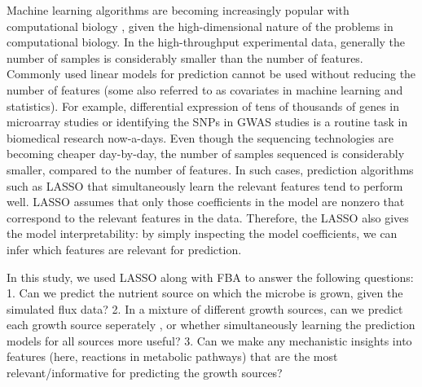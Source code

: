 \documentclass[12pt]{article}
\begin{document}
\bigskip
\noindent
Machine learning algorithms are becoming increasingly popular with computational biology , given the high-dimensional nature of the problems in computational biology. In the high-throughput experimental data, generally the number of samples is considerably smaller than the number of features. Commonly used linear models for prediction cannot be used without reducing the number of features (some also referred to as covariates in machine learning and statistics).  For example, differential expression of tens of thousands of genes in microarray studies or identifying the SNPs in GWAS studies is a routine task in biomedical research now-a-days. Even though the sequencing technologies are becoming cheaper day-by-day, the number of samples sequenced is considerably 
smaller, compared to the number of features. In such cases, prediction algorithms such as LASSO \cite{Tibshirani1996} that simultaneously learn the relevant features tend to perform well. LASSO assumes that only those coefficients in the model are nonzero that correspond to the relevant features in the data. Therefore, the LASSO also gives the model interpretability: by simply inspecting the model coefficients, we can infer which features are relevant for prediction.  

\bigskip
\noindent
In this study, we used LASSO \cite{Friedmanetal2010} along with FBA to answer the following questions: 1. Can we predict the nutrient source on which the microbe is grown, given the simulated flux data? 2. In a mixture of different growth sources, can we predict each growth source seperately , or whether simultaneously learning the prediction models for all sources more useful? 3. Can we make any mechanistic insights into features (here, reactions in metabolic pathways) that are the most relevant/informative for predicting the growth sources? 

\end{document}

